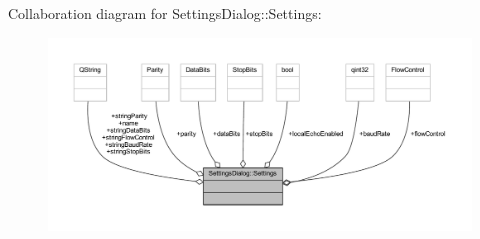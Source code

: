 Collaboration diagram for Settings\+Dialog\+:\+:Settings\+:
\nopagebreak
\begin{figure}[H]
\begin{center}
\leavevmode
\includegraphics[width=350pt]{d2/daf/a00346}
\end{center}
\end{figure}
